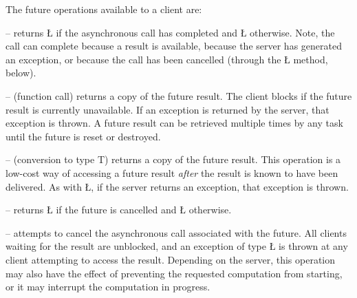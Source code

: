 \documentclass[openright,twoside]{report}
\begin{document}
The future operations available to a client are:
\begin{prefix}
\item[\LGinlinetrue\LGbegin\lgrinde\L{\LB{\V{available}}}\endlgrinde\LGend{}]
-- returns \LGinlinetrue\LGbegin\lgrinde\L{}\endlgrinde\LGend{} if the asynchronous call has completed and \LGinlinetrue\LGbegin\lgrinde\L{}\endlgrinde\LGend{} otherwise.
Note, the call can complete because a result is available, because the server has generated an exception, or because the call has been cancelled (through the \LGinlinetrue\LGbegin\lgrinde\L{}\endlgrinde\LGend{} method, below).
\item[\LGinlinetrue\LGbegin\lgrinde\L{\LB{\K{operator}()}}\endlgrinde\LGend{}]
-- (function call) returns a copy of the future result.
The client blocks if the future result is currently unavailable.
If an exception is returned by the server, that exception is thrown.
A future result can be retrieved multiple times by any task until the future is reset or destroyed.
\item[\LGinlinetrue\LGbegin\lgrinde\L{\LB{\K{operator}\0\V{T}}}\endlgrinde\LGend{}]
-- (conversion to type T) returns a copy of the future result.
This operation is a low-cost way of accessing a future result \emph{after} the result is known to have been delivered.
As with \LGinlinetrue\LGbegin\lgrinde\L{}\endlgrinde\LGend{}, if the server returns an exception, that exception is thrown.
\item[\LGinlinetrue\LGbegin\lgrinde\L{\LB{\V{cancelled}}}\endlgrinde\LGend{}]
-- returns \LGinlinetrue\LGbegin\lgrinde\L{}\endlgrinde\LGend{} if the future is cancelled and \LGinlinetrue\LGbegin\lgrinde\L{}\endlgrinde\LGend{} otherwise.
\item[\LGinlinetrue\LGbegin\lgrinde\L{\LB{\V{cancel}}}\endlgrinde\LGend{}]
\begin{sloppypar}
-- attempts to cancel the asynchronous call associated with the future.
All clients waiting for the result are unblocked, and an exception of type \LGinlinetrue\LGbegin\lgrinde\L{}\endlgrinde\LGend{} is thrown at any client attempting to access the result.
Depending on the server, this operation may also have the effect of preventing the requested computation from starting, or it may interrupt the computation in progress.
\end{sloppypar}
\end{prefix}
\end{document}

